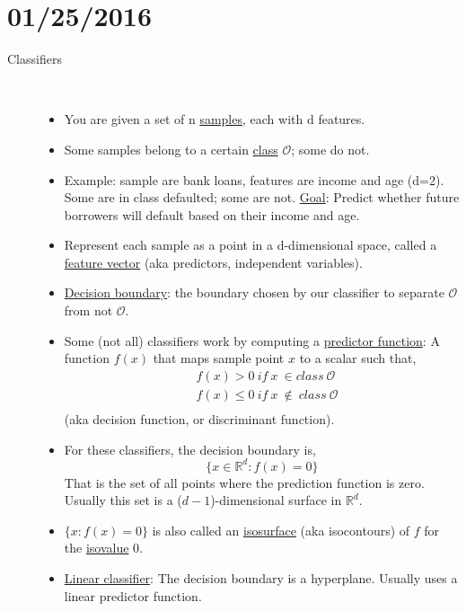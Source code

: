 \documentclass[10pt]{article}
\begin{document}
\section*{01/25/2016}
\begin{description}
	\item[Classifiers]
		\ 
		\begin{itemize}
			\item You are given a set of n \underline{samples}, each with d features.

			\item Some samples belong to a certain \underline{class} $\mathcal{O}$; some do not.

			\item Example: sample are bank loans, features are income and age (d=2). Some are in class defaulted; some are not. \underline{Goal}: Predict whether future borrowers will default based on their income and age.

			\item Represent each sample as a point in a d-dimensional space, called a \underline{feature vector} (aka predictors, independent variables).

			\item \underline{Decision boundary}: the boundary chosen by our classifier to separate $\mathcal{O}$ from not $\mathcal{O}$.

			\item Some (not all) classifiers work by computing a \underline{predictor function}: A function $f(x)$ that maps sample point $x$ to a scalar such that,
				\begin{align*}
					& f(x) > 0 \ if \ x \ \in class \ \mathcal{O} \\
					& f(x) \leq 0 \ if \ x \ \notin \ class \ \mathcal{O}\\
				\end{align*}
				(aka decision function, or discriminant function).
				
			\item For these classifiers, the decision boundary is, 
				$$ \{x \in \mathbb{R}^{d}: f(x) = 0 \} $$
				That is the set of all points where the prediction function is zero. Usually this set is a ($d-1$)-dimensional surface in $\mathbb{R}^{d}$.

			\item $\{ x: f(x) = 0 \}$ is also called an \underline{isosurface} (aka isocontours) of $f$ for the \underline{isovalue} 0.

			\item \underline{Linear classifier}: The decision boundary is a hyperplane. Usually uses a linear predictor function.


\end{itemize}
\end{description}
\end{document}
